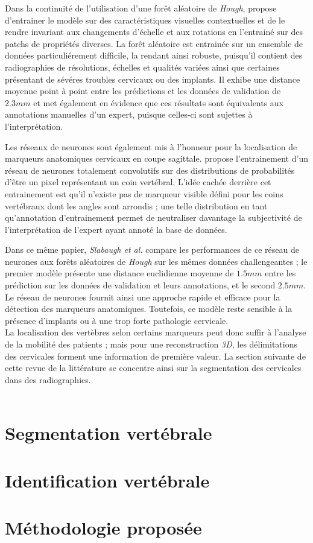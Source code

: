         Dans la continuité de l'utilisation d'une forêt aléatoire de {\itshape Hough}, \cite{AlArif2017c} propose d'entrainer le modèle sur des caractéristiques visuelles contextuelles et de le rendre invariant aux changements d'échelle et aux rotations en l'entrainé sur des patchs de propriétés diverses. La forêt aléatoire est entrainée sur un ensemble de données particuliérement difficile, la rendant ainsi robuste, puisqu'il contient des radiographies de résolutions, échelles et qualités variées ainsi que certaines présentant de sévéres troubles cervicaux ou des implants. Il exhibe une distance moyenne point à point entre les prédictions et les données de validation de $2.3 mm$ et met également en évidence que ces résultats sont équivalents aux annotations manuelles d'un expert, puisque celles-ci sont sujettes à l'interprétation.

        Les réseaux de neurones sont également mis à l'honneur pour la localisation de marqueurs anatomiques cervicaux en coupe sagittale. \cite{Slabaugh2017} propose l'entrainement d'un réseau de neurones totalement convolutifs sur des distributions de probabilités d'être un pixel représentant un coin vertébral. L'idée cachée derrière cet entrainement est qu'il n'existe pas de marqueur visible défini pour les coins vertébraux dont les angles sont arrondis ; une telle distribution en tant qu'annotation d'entrainement permet de neutraliser davantage la subjectivité de l'interprétation de l'expert ayant annoté la base de données.

        Dans ce même papier, {\itshape Slabaugh et al.} compare les performances de ce réseau de neurones aux forêts aléatoires de {\itshape Hough} sur les mêmes données challengeantes ; le premier modèle présente une distance euclidienne moyenne de $1.5 mm$ entre les prédiction sur les données de validation et leurs annotations, et le second $2.5 mm$. Le réseau de neurones fournit ainsi une approche rapide et efficace pour la détection des marqueurs anatomiques. Toutefois, ce modèle reste sensible à la présence d'implants ou à une trop forte pathologie cervicale.
        \\

        La localisation des vertèbres selon certains marqueurs peut donc suffir à l'analyse de la mobilité des patients ; mais pour une reconstruction {\itshape 3D}, les délimitations des cervicales forment une information de première valeur. La section suivante de cette revue de la littérature se concentre ainsi sur la segmentation des cervicales dans des radiographies.
        \\\\


\section{Segmentation vertébrale}

\section{Identification vertébrale}

\section{Méthodologie proposée}
